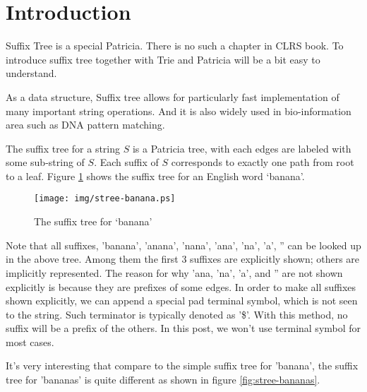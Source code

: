 \documentclass{article}
\begin{document}

\maketitle

\section{Introduction}
\label{introduction}

Suffix Tree is a special Patricia. There is no such a chapter
in CLRS book. To introduce suffix tree together with Trie and Patricia
will be a bit easy to understand. 

As a data structure, Suffix tree allows for particularly fast implementation
of many important string operations\cite{wiki-suffix-tree}. And it is 
also widely used in bio-information area such as DNA pattern 
matching\cite{ukkonen-presentation}.

The suffix tree for a string $S$ is a Patricia tree, with each edges are labeled
with some sub-string of $S$. Each suffix of $S$ corresponds to exactly one path
from root to a leaf. Figure \ref{fig:stree-banana} shows the suffix tree for
an English word `banana'.

\begin{figure}[htbp]
       \begin{center}
	\texttt{[image: img/stree-banana.ps]}
        \caption{The suffix tree for `banana'} \label{fig:stree-banana}
       \end{center}
\end{figure}

Note that all suffixes, 'banana', 'anana', 'nana', 'ana', 'na', 'a', '' can 
be looked up in the above tree. Among them the first 3 suffixes are explicitly
shown; others are implicitly represented. The reason for why 'ana, 'na', 'a', 
and '' are not shown explicitly is because they are prefixes of some edges.
In order to make all suffixes shown explicitly, we can append a special pad 
terminal symbol, which is not seen to the string. Such terminator is typically
denoted as '\$'. With this method, no suffix will be a prefix of the others.
In this post, we won't use terminal symbol for most cases.

It's very interesting that compare to the simple suffix tree for 'banana', the
suffix tree for 'bananas' is quite different as shown in figure \ref{fig:stree-bananas}.
\end{document}
